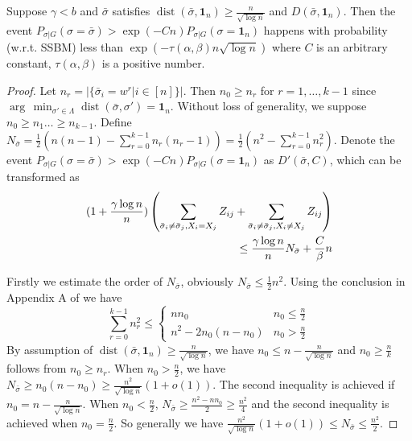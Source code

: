 \documentclass[entropy,article,submit,moreauthors,pdftex]{Definitions/mdpi}
\newcommand{\1}{\mathbbm{1}}
\DeclareMathOperator{\Dist}{dist}
\begin{document}
\begin{Lemma}\label{lem:small}
	Suppose $\gamma < b $ and $\bar{\sigma}$ satisfies $\Dist(\bar{\sigma}, \mathbf{1}_n) \geq \frac{n}{\sqrt{\log  n}}$
	and $D(\bar{\sigma}, \mathbf{1}_n)$.
	Then the event
	$P_{\sigma | G}(\sigma = \bar{\sigma} ) > \exp(-Cn) P_{\sigma | G}(\sigma = \mathbf{1}_n)$
	happens with probability (w.r.t. SSBM) less than $\exp(-\tau(\alpha,\beta) n \sqrt{\log  n} )$ where $C$ is an arbitrary constant, $\tau(\alpha,\beta)$ is a positive number.
\end{Lemma}
\begin{proof}
	Let $n_r = |\{\bar{\sigma}_i = w^r | i\in [n] \}|$. Then $n_0 \geq n_r$ for $r=1, \dots, k-1$ since  $\arg\,\min_{\sigma'\in \Lambda} \Dist(\bar{\sigma}, \sigma') = \mathbf{1}_n$.
	Without loss of generality,
	we suppose $n_0 \geq n_1 \dots \geq n_{k-1}$.
	Define $N_{\bar{\sigma}} = \frac{1}{2}(n(n-1) - \sum_{r=0}^{k-1} n_r(n_r-1))
	=\frac{1}{2}(n^2 - \sum_{r=0}^{k-1} n_r^2)$.
	Denote the event $P_{\sigma | G}(\sigma = \bar{\sigma} ) > \exp(-Cn) P_{\sigma | G}(\sigma = \mathbf{1}_n)$ as $D'(\bar{\sigma}, C)$,
	which can be transformed as
	\begin{align}
	(1 + \frac{\gamma \log n}{n})
	\left( \sum_{\bar{\sigma}_i  \neq \bar{\sigma}_j, X_i = X_j} Z_{ij} +
	\sum_{\bar{\sigma}_i  \neq \bar{\sigma}_j, X_i \neq X_j} Z_{ij} \right)\notag\\
	\leq \frac{\gamma \log n}{n} N_{\bar{\sigma}} + \frac{C}{\beta} n\label{eq:small}
	\end{align}
		
	Firstly we estimate the order of $N_{\bar{\sigma}}$, obviously $N_{\bar{\sigma}} \leq \frac{1}{2} n^2$.
	Using the conclusion in Appendix A of \cite{chen2016information} we have
	\begin{equation}
	\sum_{r=0}^{k-1} n_r^2 \leq
	\begin{cases}
	n n_0 & n_0 \leq \frac{n}{2} \\
	n^2 - 2n_0(n-n_0) & n_0 > \frac{n}{2}
	\end{cases}
	\end{equation}
	By assumption of $\Dist(\bar{\sigma}, \mathbf{1}_n) \geq \frac{n}{\sqrt{\log n}}$, we have $n_0 \leq n - \frac{n}{\sqrt{\log n}}$
	and $n_0 \geq \frac{n}{k}$ follows from $n_0 \geq n_r$.
	When $n_0 > \frac{n}{2}$,
	we have $N_{\bar{\sigma}} \geq n_0 (n - n_0) \geq \frac{n^2}{\sqrt{\log n}}(1+o(1))$.
	The second inequality is achieved if $n_0 = n - \frac{n}{\sqrt{\log n}}$.
	When $n_0 < \frac{n}{2}$,
	$N_{\bar{\sigma}} \geq \frac{n^2 - nn_0}{2} \geq \frac{n^2}{4}$ and the second inequality is achieved when $n_0 = \frac{n}{2}$.
	So generally we have $\frac{n^2}{\sqrt{\log n}}(1+o(1)) \leq N_{\bar{\sigma}} \leq \frac{n^2}{2}$.
	

\end{proof}
\end{document}
